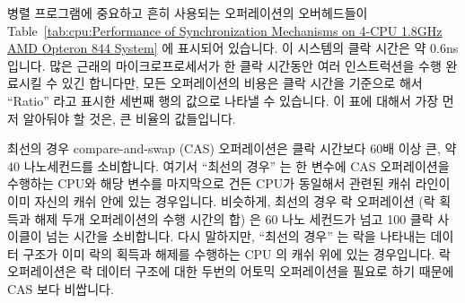 병렬 프로그램에 중요하고 흔히 사용되는 오퍼레이션의 오버헤드들이
Table~\ref{tab:cpu:Performance of Synchronization Mechanisms on 4-CPU 1.8GHz
AMD Opteron 844 System} 에 표시되어 있습니다.
이 시스템의 클락 시간은 약 0.6ns 입니다.
많은 근래의 마이크로프로세서가 한 클락 시간동안 여러 인스트럭션을 수행 완료시킬
수 있긴 합니다만, 모든 오퍼레이션의 비용은 클락 시간을 기준으로 해서 ``Ratio''
라고 표시한 세번째 행의 값으로 나타낼 수 있습니다.
이 표에 대해서 가장 먼저 알아둬야 할 것은, 큰 비율의 값들입니다.

최선의 경우 compare-and-swap (CAS) 오퍼레이션은 클락 시간보다 60배 이상 큰, 약
40 나노세컨드를 소비합니다.
여기서 ``최선의 경우'' 는 한 변수에 CAS 오퍼레이션을 수행하는 CPU와 해당 변수를
마지막으로 건든 CPU가 동일해서 관련된 캐쉬 라인이 이미 자신의 캐쉬 안에 있는
경우입니다.
비슷하게, 최선의 경우 락 오퍼레이션 (락 획득과 해제 두개 오퍼레이션의 수행
시간의 합) 은 60 나노 세컨드가 넘고 100 클락 사이클이 넘는  시간을 소비합니다.
다시 말하지만, ``최선의 경우'' 는 락을 나타내는 데이터 구조가 이미 락의 획득과
해제를 수행하는 CPU 의 캐쉬 위에 있는 경우입니다.
락 오퍼레이션은 락 데이터 구조에 대한 두번의 어토믹 오퍼레이션을 필요로 하기
때문에 CAS 보다 비쌉니다.

